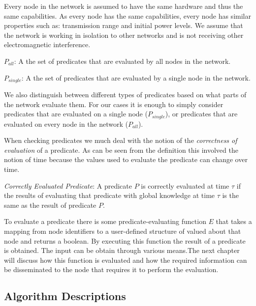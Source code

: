 Every node in the network is assumed to have the same hardware and thus the same capabilities. As every node has the same capabilities, every node has similar properties such as: transmission range and initial power levels. We assume that the network is working in isolation to other networks and is not receiving other electromagnetic interference.

\begin{mydef}
\emph{$P_{all}$}: A the set of predicates that are evaluated by all nodes in the network.
\end{mydef}

\begin{mydef}
\emph{$P_{single}$}: A the set of predicates that are evaluated by a single node in the network.
\end{mydef}

We also distinguish between different types of predicates based on what parts of the network evaluate them. For our cases it is enough to simply consider predicates that are evaluated on a single node ($P_{single}$), or predicates that are evaluated on every node in the network ($P_{all}$).

When checking predicates we much deal with the notion of the \emph{correctness of evaluation} of a predicate. As can be seen from the definition this involved the notion of time because the values used to evaluate the predicate can change over time.

\begin{mydef}
\emph{Correctly Evaluated Predicate}: A predicate $P$ is correctly evaluated at time $\tau$ if the results of evaluating that predicate with global knowledge at time $\tau$ is the same as the result of predicate $P$.
\end{mydef}

To evaluate a predicate there is some predicate-evaluating function $E$ that takes a mapping from node identifiers to a user-defined structure of valued about that node and returns a boolean. By executing this function the result of a predicate is obtained. The input can be obtain through various means.The next chapter will discuss how this function is evaluated and how the required information can be disseminated to the node that requires it to perform the evaluation.

\subsection{Algorithm Descriptions}

